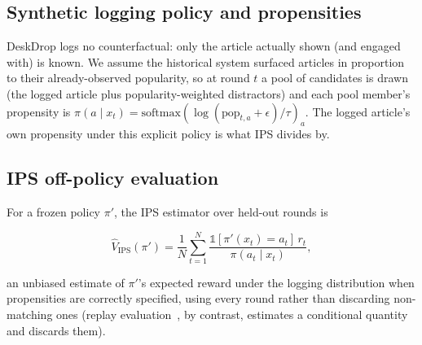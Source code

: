 \subsection{Synthetic logging policy and propensities}
DeskDrop logs no counterfactual: only the article actually shown (and
engaged with) is known. We assume the historical system surfaced articles
in proportion to their already-observed popularity, so at round $t$ a pool
of candidates is drawn (the logged article plus popularity-weighted
distractors) and each pool member's propensity is $\pi(a\mid x_t) =
\text{softmax}(\log(\text{pop}_{t,a}+\epsilon)/\tau)_a$. The logged
article's own propensity under this explicit policy is what IPS divides by.

\subsection{IPS off-policy evaluation}
For a frozen policy $\pi'$, the IPS estimator over held-out rounds is

\begin{equation}
  \hat V_{\text{IPS}}(\pi') = \frac{1}{N}\sum_{t=1}^{N}
  \frac{\mathbb{1}[\pi'(x_t) = a_t]\, r_t}{\pi(a_t \mid x_t)},
  \label{eq:ips}
\end{equation}

an unbiased estimate of $\pi'$'s expected reward under the logging
distribution when propensities are correctly specified, using every round
rather than discarding non-matching ones (replay evaluation~\cite{li2011unbiased}, by contrast,
estimates a conditional quantity and discards them).
